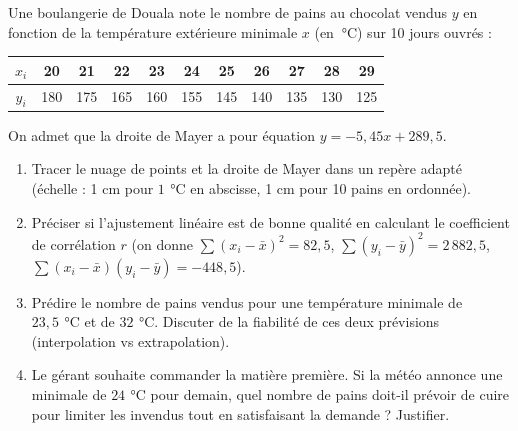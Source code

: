 \documentclass[11pt]{article}
\begin{document}
\begin{exercice}
Une boulangerie de Douala note le nombre de pains au chocolat vendus $y$ en fonction de la température extérieure minimale $x$ (en $\SI{}{\celsius}$) sur 10 jours ouvrés :
\begin{center}
\begin{tabular}{|c|c|c|c|c|c|c|c|c|c|c|}
\hline
$x_i$ & 20 & 21 & 22 & 23 & 24 & 25 & 26 & 27 & 28 & 29 \\ \hline
$y_i$ & 180 & 175 & 165 & 160 & 155 & 145 & 140 & 135 & 130 & 125 \\ \hline
\end{tabular}
\end{center}
On admet que la droite de Mayer a pour équation $y = -5,45x + 289,5$.
\begin{enumerate}
    \item Tracer le nuage de points et la droite de Mayer dans un repère adapté (échelle : 1 cm pour $1\,\SI{}{\celsius}$ en abscisse, 1 cm pour 10 pains en ordonnée).
    \item Préciser si l'ajustement linéaire est de bonne qualité en calculant le coefficient de corrélation $r$ (on donne $\sum (x_i-\bar{x})^2 = 82,5$, $\sum (y_i-\bar{y})^2 = 2\,882,5$, $\sum (x_i-\bar{x})(y_i-\bar{y}) = -448,5$).
    \item Prédire le nombre de pains vendus pour une température minimale de $23,5\,\SI{}{\celsius}$ et de $32\,\SI{}{\celsius}$. Discuter de la fiabilité de ces deux prévisions (interpolation vs extrapolation).
    \item Le gérant souhaite commander la matière première. Si la météo annonce une minimale de $24\,\SI{}{\celsius}$ pour demain, quel nombre de pains doit-il prévoir de cuire pour limiter les invendus tout en satisfaisant la demande ? Justifier.
\end{enumerate}
\end{exercice}
\end{document}

